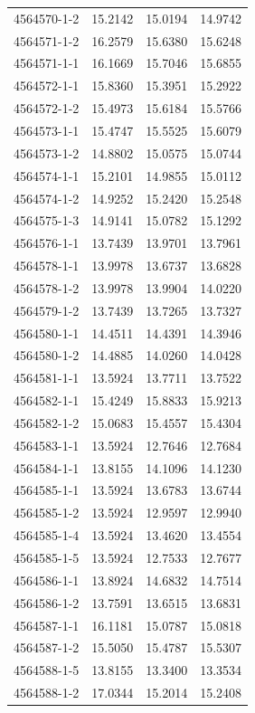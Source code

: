 \begin{longtable}{lrrr}
4564570-1-2 & 15.2142 & 15.0194 & 14.9742 \\
4564571-1-2 & 16.2579 & 15.6380 & 15.6248 \\
4564571-1-1 & 16.1669 & 15.7046 & 15.6855 \\
4564572-1-1 & 15.8360 & 15.3951 & 15.2922 \\
4564572-1-2 & 15.4973 & 15.6184 & 15.5766 \\
4564573-1-1 & 15.4747 & 15.5525 & 15.6079 \\
4564573-1-2 & 14.8802 & 15.0575 & 15.0744 \\
4564574-1-1 & 15.2101 & 14.9855 & 15.0112 \\
4564574-1-2 & 14.9252 & 15.2420 & 15.2548 \\
4564575-1-3 & 14.9141 & 15.0782 & 15.1292 \\
4564576-1-1 & 13.7439 & 13.9701 & 13.7961 \\
4564578-1-1 & 13.9978 & 13.6737 & 13.6828 \\
4564578-1-2 & 13.9978 & 13.9904 & 14.0220 \\
4564579-1-2 & 13.7439 & 13.7265 & 13.7327 \\
4564580-1-1 & 14.4511 & 14.4391 & 14.3946 \\
4564580-1-2 & 14.4885 & 14.0260 & 14.0428 \\
4564581-1-1 & 13.5924 & 13.7711 & 13.7522 \\
4564582-1-1 & 15.4249 & 15.8833 & 15.9213 \\
4564582-1-2 & 15.0683 & 15.4557 & 15.4304 \\
4564583-1-1 & 13.5924 & 12.7646 & 12.7684 \\
4564584-1-1 & 13.8155 & 14.1096 & 14.1230 \\
4564585-1-1 & 13.5924 & 13.6783 & 13.6744 \\
4564585-1-2 & 13.5924 & 12.9597 & 12.9940 \\
4564585-1-4 & 13.5924 & 13.4620 & 13.4554 \\
4564585-1-5 & 13.5924 & 12.7533 & 12.7677 \\
4564586-1-1 & 13.8924 & 14.6832 & 14.7514 \\
4564586-1-2 & 13.7591 & 13.6515 & 13.6831 \\
4564587-1-1 & 16.1181 & 15.0787 & 15.0818 \\
4564587-1-2 & 15.5050 & 15.4787 & 15.5307 \\
4564588-1-5 & 13.8155 & 13.3400 & 13.3534 \\
4564588-1-2 & 17.0344 & 15.2014 & 15.2408 \\

\end{longtable}
